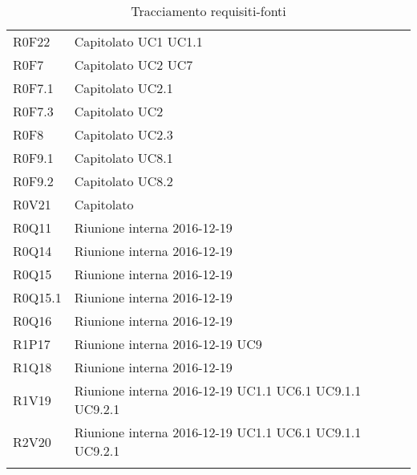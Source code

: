 \documentclass[../AnalisiDeiRequisiti.tex]{subfiles}
\begin{document}
\begin{longtable}{p{5cm}!{\VRule[1pt]}p{5cm}}
		\\
		R0F22 & Capitolato \newline UC1
		\newline UC1.1
		\\
		R0F7 & Capitolato \newline UC2
		\newline UC7
		\\
		R0F7.1 & Capitolato \newline UC2.1
		\\
		R0F7.3 & Capitolato \newline UC2
		\\
		R0F8 & Capitolato \newline UC2.3
		\\
		R0F9.1 & Capitolato \newline UC8.1
		\\
		R0F9.2 & Capitolato \newline UC8.2
		\\
		R0V21 & Capitolato \\
		R0Q11 & Riunione interna 2016-12-19 \\
		R0Q14 & Riunione interna 2016-12-19 \\
		R0Q15 & Riunione interna 2016-12-19 \\
		R0Q15.1 & Riunione interna 2016-12-19 \\
		R0Q16 & Riunione interna 2016-12-19 \\
		R1P17 & Riunione interna 2016-12-19 \newline UC9
		\\
		R1Q18 & Riunione interna 2016-12-19 \\
		R1V19 & Riunione interna 2016-12-19 \newline UC1.1
		\newline UC6.1
		\newline UC9.1.1
		\newline UC9.2.1
		\\
		R2V20 & Riunione interna 2016-12-19 \newline UC1.1
		\newline UC6.1
		\newline UC9.1.1
		\newline UC9.2.1
		\\
		\caption{Tracciamento requisiti-fonti}
	\end{longtable}
	
	\newpage
\end{document}
